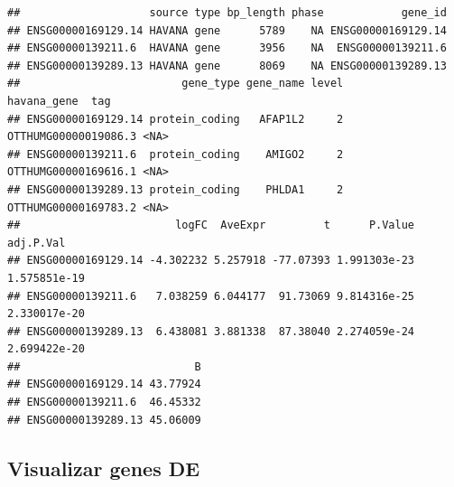 \documentclass[
]{article}
\newenvironment{Shaded}{\begin{snugshade}}{\end{snugshade}}
\newcommand{\CommentTok}[1]{\textcolor[rgb]{0.56,0.35,0.01}{\textit{#1}}}
\newcommand{\FunctionTok}[1]{\textcolor[rgb]{0.13,0.29,0.53}{\textbf{#1}}}
\newcommand{\NormalTok}[1]{#1}
\newcommand{\SpecialCharTok}[1]{\textcolor[rgb]{0.81,0.36,0.00}{\textbf{#1}}}
\newcommand{\StringTok}[1]{\textcolor[rgb]{0.31,0.60,0.02}{#1}}
\begin{document}
\begin{Shaded}
\end{Shaded}

\begin{verbatim}
##                    source type bp_length phase            gene_id
## ENSG00000169129.14 HAVANA gene      5789    NA ENSG00000169129.14
## ENSG00000139211.6  HAVANA gene      3956    NA  ENSG00000139211.6
## ENSG00000139289.13 HAVANA gene      8069    NA ENSG00000139289.13
##                         gene_type gene_name level          havana_gene  tag
## ENSG00000169129.14 protein_coding   AFAP1L2     2 OTTHUMG00000019086.3 <NA>
## ENSG00000139211.6  protein_coding    AMIGO2     2 OTTHUMG00000169616.1 <NA>
## ENSG00000139289.13 protein_coding    PHLDA1     2 OTTHUMG00000169783.2 <NA>
##                        logFC  AveExpr         t      P.Value    adj.P.Val
## ENSG00000169129.14 -4.302232 5.257918 -77.07393 1.991303e-23 1.575851e-19
## ENSG00000139211.6   7.038259 6.044177  91.73069 9.814316e-25 2.330017e-20
## ENSG00000139289.13  6.438081 3.881338  87.38040 2.274059e-24 2.699422e-20
##                           B
## ENSG00000169129.14 43.77924
## ENSG00000139211.6  46.45332
## ENSG00000139289.13 45.06009
\end{verbatim}

\subsection{Visualizar genes DE}\label{visualizar-genes-de}
\end{document}
